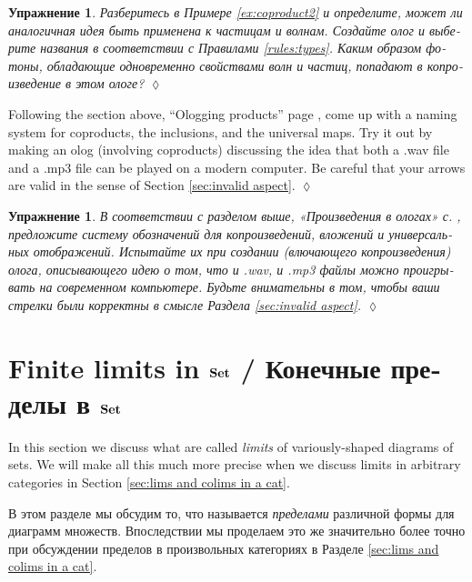 \documentclass[a4paper]{book}
\def\Set{{\bf Set}}
\theoremstyle{myth}
\newtheorem{excENG}[envENG]{\begin{english}Exercise\end{english}}
\newenvironment{exerciseENG}{\begin{excENG}}{\hspace*{\fill}$\lozenge$\end{excENG}}
\newtheorem{excRUS}[envRUS]{Упражнение}
\newenvironment{exerciseRUS}{\begin{excRUS}}{\hspace*{\fill}$\lozenge$\end{excRUS}}
\begin{document}
\begin{russian}
\begin{exerciseRUS}
Разберитесь в Примере \ref{ex:coproduct2} и определите, может ли аналогичная идея быть применена к частицам и волнам. Создайте олог и выберите названия в соответствии с Правилами \ref{rules:types}. Каким образом фотоны, обладающие одновременно свойствами волн и частиц, попадают в копроизведение в этом ологе?
\end{exerciseRUS}

\begin{exerciseENG}
Following the section above, “Ologging products” page \pageref{sec:ologging products}, come up with a naming system for coproducts, the inclusions, and the universal maps. Try it out by making an olog (involving coproducts) discussing the idea that both a .wav file and a .mp3 file can be played on a modern computer. Be careful that your arrows are valid in the sense of Section \ref{sec:invalid aspect}.
\end{exerciseENG}

\begin{exerciseRUS}
В соответствии с разделом выше, «Произведения в ологах» с. \pageref{sec:ologging products}, предложите систему обозначений для копроизведений, вложений и универсальных отображений. Испытайте их при создании (влючающего копроизведения) олога, описывающего идею о том, что и .wav, и .mp3 файлы можно проигрывать на современном компьютере. Будьте внимательны в том, чтобы ваши стрелки были корректны в смысле Раздела \ref{sec:invalid aspect}.
\end{exerciseRUS}


\section{Finite limits in $\Set$ / Конечные пределы в $\Set$}\label{sec:finite limits}

In this section we discuss what are called {\em limits} of variously-shaped diagrams of sets. We will make all this much more precise when we discuss limits in arbitrary categories in Section \ref{sec:lims and colims in a cat}.

В этом разделе мы обсудим то, что называется {\em пределами} различной формы для диаграмм множеств. Впоследствии мы проделаем это же значительно более точно при обсуждении пределов в произвольных категориях в Разделе \ref{sec:lims and colims in a cat}.



\end{russian}
\end{document}
